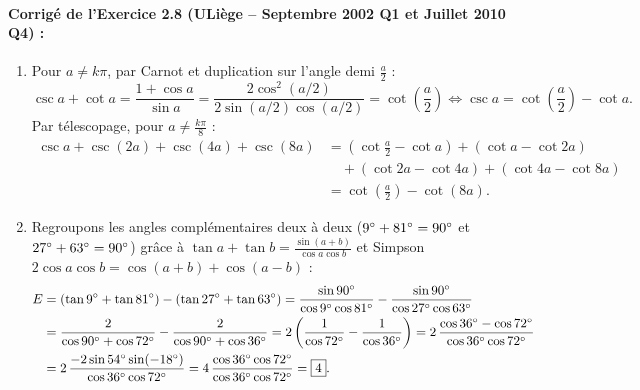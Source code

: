 \paragraph{Corrigé de l'Exercice 2.8 (ULiège -- Septembre 2002 Q1 et Juillet 2010 Q4) :}
\begin{enumerate}[label=(\alph*)]
    \item Pour $a \neq k\pi$, par Carnot et duplication sur l'angle demi $\frac{a}{2}$ :
    \[
        \csc a + \cot a = \frac{1 + \cos a}{\sin a} = \frac{2\cos^2(a/2)}{2\sin(a/2)\cos(a/2)} = \cot\left(\frac{a}{2}\right) \iff \csc a = \cot\left(\frac{a}{2}\right) - \cot a.
    \]
    Par télescopage, pour $a \neq \frac{k\pi}{8}$ :
    \begin{align*}
        \csc a + \csc(2a) + \csc(4a) + \csc(8a) &= \left(\cot\frac{a}{2} - \cot a\right) + (\cot a - \cot 2a) \\
        &\quad + (\cot 2a - \cot 4a) + (\cot 4a - \cot 8a) \\
        &= \boxed{\cot\left(\frac{a}{2}\right) - \cot(8a)}.
    \end{align*}
    \item Regroupons les angles complémentaires deux à deux ($9\degree + 81\degree = 90\degree$ et $27\degree + 63\degree = 90\degree$) grâce à $\tan a + \tan b = \frac{\sin(a+b)}{\cos a\cos b}$ et Simpson $2\cos a\cos b = \cos(a+b) + \cos(a-b)$ :
    \begin{align*}
        E &= (\tan 9\degree + \tan 81\degree) - (\tan 27\degree + \tan 63\degree) = \frac{\sin 90\degree}{\cos 9\degree\cos 81\degree} - \frac{\sin 90\degree}{\cos 27\degree\cos 63\degree} \\
        &= \frac{2}{\cos 90\degree + \cos 72\degree} - \frac{2}{\cos 90\degree + \cos 36\degree} = 2\left(\frac{1}{\cos 72\degree} - \frac{1}{\cos 36\degree}\right) = 2\,\frac{\cos 36\degree - \cos 72\degree}{\cos 36\degree\cos 72\degree} \\
        &= 2\,\frac{-2\sin 54\degree\sin(-18\degree)}{\cos 36\degree\cos 72\degree} = 4\,\frac{\cos 36\degree\cos 72\degree}{\cos 36\degree\cos 72\degree} = \boxed{4}.
    \end{align*}
\end{enumerate}

